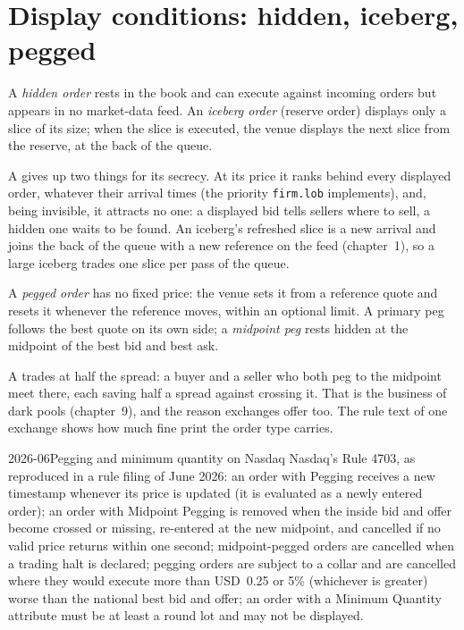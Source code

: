 \section{Display conditions: hidden, iceberg, pegged}

\begin{definition}\label{def:mx:order-types-and-their-uses:hidden}
A \emph{hidden order} rests in the book and can execute against incoming orders but appears in no market-data feed. An \emph{iceberg
order} (reserve order) displays only a slice of its size; when the slice is executed, the venue displays the next slice from the
reserve, at the back of the queue.
\end{definition}

A  gives up two things for its secrecy. At its price it ranks behind every displayed order, whatever their arrival times (the priority
\texttt{firm.lob} implements), and, being invisible, it attracts no one: a displayed bid tells sellers where to sell, a hidden one waits to be found.
An iceberg's refreshed slice is a new arrival and joins the back of the queue with a new reference on the feed (chapter~1), so a large iceberg trades
one slice per pass of the queue.

\begin{definition}\label{def:mx:order-types-and-their-uses:peg}
A \emph{pegged order} has no fixed price: the venue sets it from a reference quote and resets it whenever the reference moves,
within an optional limit. A primary peg follows the best quote on its own side; a \emph{midpoint peg} rests hidden at the midpoint
of the best bid and best ask.
\end{definition}

A  trades at half the spread: a buyer and a seller who both peg to the midpoint meet there, each saving half a spread against crossing it.
That is the business of dark pools (chapter~9), and the reason exchanges offer  too. The rule text of one exchange shows how much fine
print the order type carries.

\begin{dated}{2026-06}{Pegging and minimum quantity on Nasdaq}\label{dat:mx:order-types-and-their-uses:nasdaq}
Nasdaq's Rule 4703, as reproduced in a rule filing of June 2026: an order with Pegging receives a new timestamp whenever its price is updated (it is
evaluated as a newly entered order); an order with Midpoint Pegging is removed when the inside bid and offer become crossed or missing, re-entered at
the new midpoint, and cancelled if no valid price returns within one second; midpoint-pegged orders are cancelled when a trading halt is declared;
pegging orders are subject to a collar and are cancelled where they would execute more than USD~0.25 or 5\% (whichever is greater) worse than the
national best bid and offer; an order with a Minimum Quantity attribute must be at least a round lot and may not be displayed.
\end{dated}


